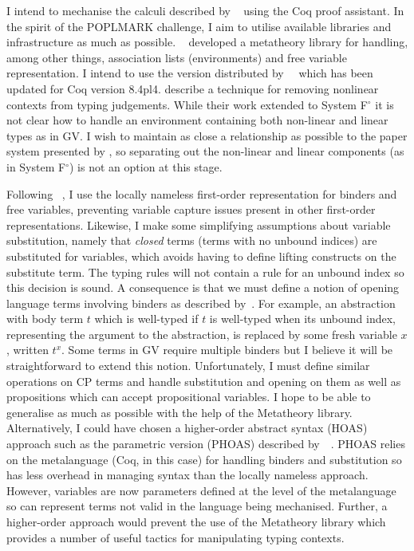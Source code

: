 \documentclass{mprop}
\newcommand{\fpop}{System F${}^\circ$\xspace}
\newcommand{\1}{\textbf{1}\xspace}
\begin{document}

I intend to mechanise the calculi described by
\citeauthor{Wadler:2012}~\cite{Wadler:2012} using the Coq proof assistant. In
the spirit of the POPLMARK challenge, I aim to utilise available libraries and
infrastructure as much as
possible. \citeauthor{Aydemir:2008:EFM}~\cite{Aydemir:2008:EFM} developed a
metatheory library for handling, among other things, association lists
(environments) and free variable representation. I intend to use the version
distributed by~\citeauthor{Park:2014:MMW}~\cite{Park:2014:MMW} which has been
updated for Coq version 8.4pl4. \citeauthor{Park:2014:MMW} describe a
technique for removing nonlinear contexts from typing judgements. While their
work extended to \fpop it is not clear how to handle an environment containing
both non-linear and linear types as in GV. I wish to maintain as close a
relationship as possible to the paper system presented by
\citeauthor{Wadler:2012}, so separating out the non-linear and linear
components (as in \fpop) is not an option at this stage.

Following \citeauthor{Aydemir:2008:EFM}~\cite{Aydemir:2008:EFM}, I use the
locally nameless first-order representation for binders and free variables,
preventing variable capture issues present in other first-order
representations. Likewise, I make some simplifying assumptions about variable
substitution, namely that \textit{closed} terms (terms with no unbound
indices) are substituted for variables, which avoids having to define lifting
constructs on the substitute term. The typing rules will not contain a rule
for an unbound index so this decision is sound. A consequence is that we must
define a notion of opening language terms involving binders as described
by~\citeauthor{Aydemir:2008:EFM}. For example, an abstraction with body term
$t$ which is well-typed if $t$ is well-typed when its unbound index,
representing the argument to the abstraction, is replaced by some fresh
variable $x$, written $t^x$. Some terms in GV require multiple binders but I
believe it will be straightforward to extend this notion. Unfortunately, I
must define similar operations on CP terms and handle substitution and opening
on them as well as propositions which can accept propositional variables. I
hope to be able to generalise as much as possible with the help of the
Metatheory library. Alternatively, I could have chosen a higher-order abstract
syntax (HOAS) approach such as the parametric version (PHOAS) described
by~\citeauthor{Chlipala:2008:PHOAS}~\cite{Chlipala:2008:PHOAS}. PHOAS relies
on the metalanguage (Coq, in this case) for handling binders and substitution
so has less overhead in managing syntax than the locally nameless
approach. However, variables are now parameters defined at the level of the
metalanguage so can represent terms not valid in the language being
mechanised. Further, a higher-order approach would prevent the use of the
Metatheory library which provides a number of useful tactics for manipulating
typing contexts.
\end{document}
